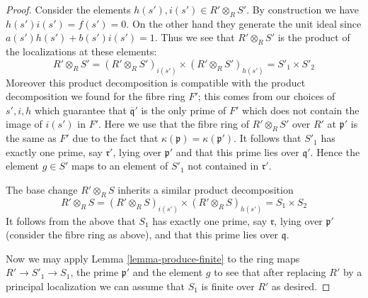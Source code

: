 \begin{proof}
\medskip\noindent
Consider the elements $h(s'), i(s') \in R' \otimes_R S'$.
By construction we have $h(s')i(s') = f(s') = 0$. On the other
hand they generate the unit ideal since $a(s')h(s') + b(s')i(s') = 1$.
Thus we see that $R' \otimes_R S'$ is the product of the
localizations at these elements:
$$
R' \otimes_R S'
=
(R' \otimes_R S')_{i(s')}
\times
(R' \otimes_R S')_{h(s')}
=
S'_1 \times S'_2
$$
Moreover this product decomposition is compatible with the product
decomposition we found for the fibre ring $F'$; this comes from our
choices of $s', i, h$ which guarantee that $\overline{\mathfrak q}'$
is the only prime of $F'$ which does not contain the image of $i(s')$
in $F'$. Here we use that the fibre ring of $R'\otimes_R S'$ over $R'$ at
$\mathfrak p'$ is the same as $F'$ due to the fact that
$\kappa(\mathfrak p) = \kappa(\mathfrak p')$.
It follows that $S'_1$  has exactly
one prime, say $\mathfrak r'$,
lying over $\mathfrak p'$ and
that this prime lies over $\mathfrak q'$.
Hence the element $g \in S'$ maps to an element of $S'_1$ not contained
in $\mathfrak r'$.

\medskip\noindent
The base change $R'\otimes_R S$ inherits a similar product decomposition
$$
R' \otimes_R S
=
(R' \otimes_R S)_{i(s')}
\times
(R' \otimes_R S)_{h(s')}
=
S_1 \times S_2
$$
It follows from the above that $S_1$ has exactly
one prime, say $\mathfrak r$,
lying over $\mathfrak p'$ (consider the fibre ring as above),
and that this prime lies over $\mathfrak q$.

\medskip\noindent
Now we may apply Lemma \ref{lemma-produce-finite} to the ring maps
$R' \to S'_1 \to S_1$, the prime $\mathfrak p'$ and
the element $g$ to see that after replacing $R'$ by
a principal localization we can assume that $S_1$ is
finite over $R'$ as desired.
\end{proof}
